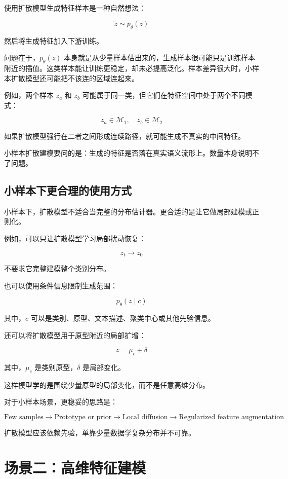 使用扩散模型生成特征样本是一种自然想法：

\[
\tilde{z} \sim p_\theta(z)
\]

然后将生成特征加入下游训练。

问题在于，\(p_\theta(z)\) 本身就是从少量样本估出来的，生成样本很可能只是训练样本附近的插值。这类样本能让训练更稳定，却未必提高泛化。样本差异很大时，小样本扩散模型还可能把不该连的区域连起来。

例如，两个样本 \(z_a\) 和 \(z_b\) 可能属于同一类，但它们在特征空间中处于两个不同模式：

\[
z_a \in \mathcal{M}_1,\quad z_b \in \mathcal{M}_2
\]

如果扩散模型强行在二者之间形成连续路径，就可能生成不真实的中间特征。

小样本扩散建模要问的是：生成的特征是否落在真实语义流形上。数量本身说明不了问题。

\subsection{小样本下更合理的使用方式}

小样本下，扩散模型不适合当完整的分布估计器。更合适的是让它做局部建模或正则化。

例如，可以只让扩散模型学习局部扰动恢复：

\[
z_t \rightarrow z_0
\]

不要求它完整建模整个类别分布。

也可以使用条件信息限制生成范围：

\[
p_\theta(z \mid c)
\]

其中，\(c\) 可以是类别、原型、文本描述、聚类中心或其他先验信息。

还可以将扩散模型用于原型附近的局部扩增：

\[
z = \mu_c + \delta
\]

其中，\(\mu_c\) 是类别原型，\(\delta\) 是局部变化。

这样模型学的是围绕少量原型的局部变化，而不是任意高维分布。

对于小样本场景，更稳妥的思路是：

\[
\text{Few samples}
\rightarrow
\text{Prototype or prior}
\rightarrow
\text{Local diffusion}
\rightarrow
\text{Regularized feature augmentation}
\]

扩散模型应该依赖先验，单靠少量数据学复杂分布并不可靠。

\section{场景二：高维特征建模}

